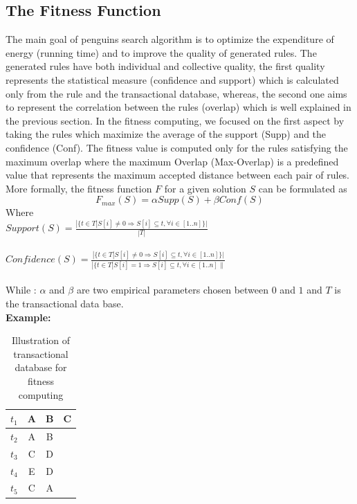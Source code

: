 \documentclass[preprint,12pt]{elsarticle}
\begin{document}
\subsection{The Fitness Function}
The main goal of penguins search algorithm is to optimize the
expenditure of energy (running time) and to improve the
quality of generated rules. The generated rules have both
individual and collective quality, the first quality represents
the statistical measure (confidence and support) which is
calculated only from the rule and the transactional database,
whereas, the second one aims to represent the correlation between
the rules (overlap) which is well explained in the previous
section. In the fitness computing, we focused on the first aspect
by taking the rules which maximize the average of the support (Supp) and the confidence (Conf). The fitness value is computed only for the rules satisfying the maximum overlap where
the maximum Overlap (Max-Overlap) is a predefined value that represents the
maximum accepted distance between each pair of rules.
More formally, the fitness function $F$ for a given solution $S$
can be formulated as\\
\begin{equation}
\label{equa:eq1} F_{max}(S)=\alpha Supp(S) + \beta Conf
(S)
\end{equation}
Where\\

$Support(S)= \frac{|\{t \in T | S[i] \neq 0 \Rightarrow S[i]
\subseteq t,  \forall i \in [1..n]\}|}{|T|}$\\ \\
$Confidence(S)= \frac{|\{t \in T | S[i]\neq 0 \Rightarrow
S[i]\subseteq t, \forall i \in [1..n]\}|}{|\{t \in T | S[i]=1
\Rightarrow S[i]\subseteq t, \forall i \in [1..n]\|}$\\
\\
While :
$\alpha$ and $\beta$ are two empirical parameters chosen between
$0$ and $1$ and $T$ is the transactional data base.
\\
\textbf{Example:}
\begin{table}[h]
\centering
\begin{tabular}{c c c c}
\hline
$t_{1}$& A & B & C\\
\hline
$t_{2}$& A & B & \\
\hline
$t_{3}$& C & D & \\
\hline
$t_{4}$& E & D & \\
\hline
$t_{5}$& C & A &\\
\hline
\end{tabular}
\caption{Illustration of transactional database for fitness computing}
\label{TransacionalDatabaseIllustration}
\end{table}
\end{document}
